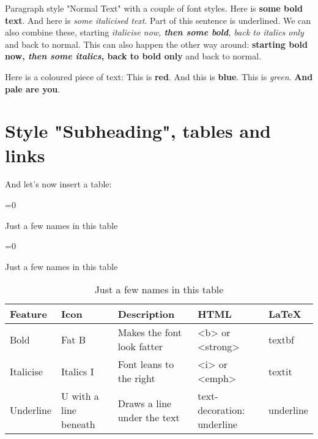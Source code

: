 Paragraph style "Normal Text" with a couple of font
styles. Here is 
\textbf{some bold text}. And here is 
\textit{some italicised text}. 
Part of this sentence is underlined. 
We can also combine these, starting 
\textit{italicise now, \textbf{then some bold}, back to italics only} and back to normal. This can
also happen the other way around: 
\textbf{starting bold now, \textit{then some italics}, back to bold only} and
back to normal.

Here is a coloured piece of text: 
\textcolor[rgb]{1,0,0}{This is \textbf{red}.}
\textcolor[rgb]{0,0,1}{And this is \textbf{blue}.}
\textcolor[rgb]{0,1,0}{This is \textit{green}.}
\textcolor[rgb]{0.5,0.5,0.5}{\textbf{And pale are you}.}

\lipsum[3]

\section{Style "Subheading", tables and links}
\lipsum[2]
And let's now insert a table:

\noindent
\begin{table}[H]
	\begin{center}
   \small
   \begin{adjustbox}{max width=\textwidth}
	\ifnum{}=0 
		\caption*{Just a few names in this table}
	\else
		\ifnum{}=0 
			\caption*{Just a few names in this table}
		\else
			\caption{Just a few names in this table} 
		\fi
	\fi
		\begin{tabular}{lllll}
			\toprule
			Feature & Icon & Description & HTML & LaTeX \\
			\midrule
			Bold & Fat B & Makes the font look fatter & <b> or <strong> & textbf \\
			Italicise & Italics I & Font leans to the right & <i> or <emph> & textit \\
			Underline & U with a line beneath & Draws a line under the text & text-decoration: underline & underline \\
			\bottomrule
		\end{tabular}
   \end{adjustbox}
	\end{center}
\end{table}

